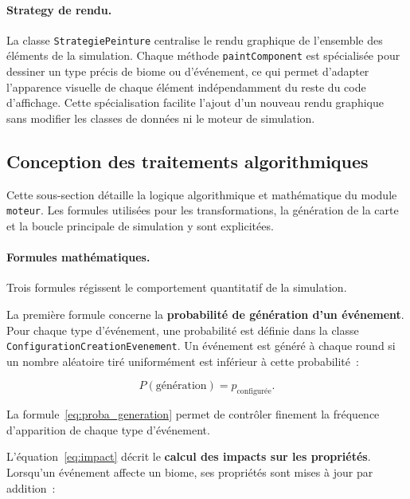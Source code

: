 \paragraph{Strategy de rendu.}
La classe \texttt{StrategiePeinture} centralise le rendu graphique de l'ensemble
des éléments de la simulation. Chaque méthode \texttt{paintComponent} est
spécialisée pour dessiner un type précis de biome ou d'événement, ce qui permet
d'adapter l'apparence visuelle de chaque élément indépendamment du reste du code
d'affichage. Cette spécialisation facilite l'ajout d'un nouveau rendu graphique
sans modifier les classes de données ni le moteur de simulation.

\subsection{Conception des traitements algorithmiques}
\label{subsec:traitements}

Cette sous-section détaille la logique algorithmique et mathématique du module
\texttt{moteur}. Les formules utilisées pour les transformations, la génération
de la carte et la boucle principale de simulation y sont explicitées.

\paragraph{Formules mathématiques.}
Trois formules régissent le comportement quantitatif de la simulation.

La première formule concerne la \textbf{probabilité de génération d'un événement}.
Pour chaque type d'événement, une probabilité est définie dans la classe
\texttt{ConfigurationCreationEvenement}. Un événement est généré à chaque round
si un nombre aléatoire tiré uniformément est inférieur à cette probabilité~:

\begin{equation}
  \label{eq:proba_generation}
  P(\text{génération}) = p_{\text{configurée}}.
\end{equation}

La formule~\ref{eq:proba_generation} permet de contrôler finement la fréquence
d'apparition de chaque type d'événement.

L'équation~\ref{eq:impact} décrit le \textbf{calcul des impacts sur les propriétés}.
Lorsqu'un événement affecte un biome, ses propriétés sont mises à jour par
addition~:

